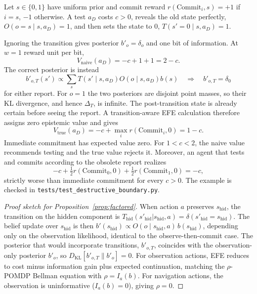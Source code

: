 \documentclass[manuscript, screen, review]{jair}
\begin{document}
\begin{example}
\label{ex:destructive}
Let $s\in\{0,1\}$ have uniform prior and commit reward $r(\mathrm{Commit}_i,s)=+1$ if $i=s$, $-1$ otherwise. A test $a_D$ costs $c>0$, reveals the old state perfectly, $O(o=s\mid s,a_D)=1$, and then sets the state to $0$, $T(s'=0\mid s,a_D)=1$.

Ignoring the transition gives posterior $b'_o=\delta_o$ and one bit of information. At $w=1$ reward unit per bit,
\[
V_{\mathrm{naive}}(a_D)=-c+1+1=2-c.
\]
The correct posterior is instead
\[
b'_{o,T}(s')\propto\sum_s T(s'\mid s,a_D)O(o\mid s,a_D)b(s)\quad\Longrightarrow\quad b'_{o,T}=\delta_0
\]
for either report. For $o=1$ the two posteriors are disjoint point masses, so their KL divergence, and hence $\Delta_T$, is infinite. The post-transition state is already certain before seeing the report. A transition-aware EFE calculation therefore assigns zero epistemic value and gives
\[
V_{\mathrm{true}}(a_D)=-c+\max_i r(\mathrm{Commit}_i,0)=1-c.
\]
Immediate commitment has expected value zero. For $1<c<2$, the naive value recommends testing and the true value rejects it. Moreover, an agent that tests and commits according to the obsolete report realizes
\[
-c+\tfrac12r(\mathrm{Commit}_0,0)+\tfrac12r(\mathrm{Commit}_1,0)=-c,
\]
strictly worse than immediate commitment for every $c>0$. The example is checked in \texttt{tests/\allowbreak test\_\allowbreak destructive\_\allowbreak boundary.py}.
\end{example}

\begin{proof}[Proof sketch for Proposition~\ref{prop:factored}]
When action $a$ preserves $s_{\mathrm{hid}}$, the transition on the hidden component is $T_{\mathrm{hid}}(s'_{\mathrm{hid}} | s_{\mathrm{hid}}, a) = \delta(s'_{\mathrm{hid}} = s_{\mathrm{hid}})$. The belief update over $s_{\mathrm{hid}}$ is then $b'(s_{\mathrm{hid}}) \propto O(o \mid s_{\mathrm{hid}}, a)\, b(s_{\mathrm{hid}})$, depending only on the observation likelihood, identical to the observe-then-commit case. The posterior that would incorporate transitions, $b'_{o,T}$, coincides with the observation-only posterior $b'_o$, so $D_{\mathrm{KL}}[b'_{o,T} \| b'_o] = 0$. For observation actions, EFE reduces to cost minus information gain plus expected continuation, matching the $\rho$-POMDP Bellman equation with $\rho = I_a(b)$. For navigation actions, the observation is uninformative ($I_a(b) = 0$), giving $\rho = 0$.
\end{proof}
\end{document}
